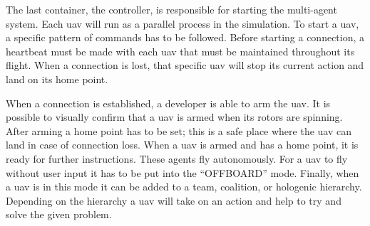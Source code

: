 The last container, the controller, is responsible for starting the multi-agent system. Each \acs{uav} 
will run as a parallel process in the simulation. 
To start a \acs{uav}, a specific pattern of commands has to be followed. Before starting a connection, 
a heartbeat must be made with each \acs{uav} 
that must be maintained throughout its flight. When a connection is lost, that specific \acs{uav} will 
stop its current action and land on its home point.

When a connection is established, a developer is able to arm the \acs{uav}. It is possible to visually 
confirm that a \acs{uav} is armed when its rotors are spinning. 
After arming a home point has to be set; this is a safe place where the \acs{uav} can land in case of 
connection loss. When a \acs{uav} is armed and has a 
home point, it is ready for further instructions. These agents fly autonomously. For a \acs{uav} to fly without 
user input it has to be put into the “OFFBOARD” mode. 
Finally, when a \acs{uav} is in this mode it can be added to a team, coalition, or hologenic hierarchy. 
Depending on the hierarchy a \acs{uav} will take on an action 
and help to try and solve the given problem.

